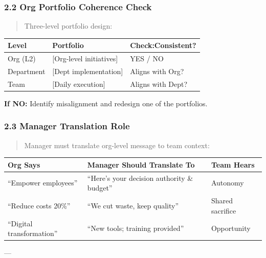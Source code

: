 \subsubsection*{2.2 Org Portfolio Coherence Check}

\begin{quote}
Three-level portfolio design:
\end{quote}

\begin{center}
\begin{tabular}{@{}lll@{}}
\toprule
\textbf{Level} & \textbf{Portfolio} & \textbf{Check:Consistent?} \\
\midrule
Org (L2) & [Org-level initiatives] & YES / NO \\
Department & [Dept implementation] & Aligns with Org? \\
Team & [Daily execution] & Aligns with Dept? \\
\midrule
\end{tabular}
\end{center}

\textbf{If NO:} Identify misalignment and redesign one of the portfolios.

\subsubsection*{2.3 Manager Translation Role}

\begin{quote}
Manager must translate org-level message to team context:
\end{quote}

\begin{center}
\begin{tabular}{@{}lll@{}}
\toprule
\textbf{Org Says} & \textbf{Manager Should Translate To} & \textbf{Team Hears} \\
\midrule
``Empower employees'' & ``Here's your decision authority \& budget'' & Autonomy \\
``Reduce costs 20\%'' & ``We cut waste, keep quality'' & Shared sacrifice \\
``Digital transformation'' & ``New tools; training provided'' & Opportunity \\
\midrule
\end{tabular}
\end{center}

---


